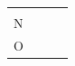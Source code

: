 \begin{enumerate}[noitemsep, label=\textbf{\arabic*}. ]
{\begin{tabular}[t]{|l|l|l|l|}
    
         &
    
    
         &
    
    
     \tabularnewline\cline{1-1}\cline{2-2}\cline{3-3}\cline{4-4}
    
    
        \begin{math}\mathrm{N}\end{math} &
    
    
         &
    
    
         &
    
    
     \tabularnewline\cline{1-1}\cline{2-2}\cline{3-3}\cline{4-4}
    
    
        \begin{math}\mathrm{O}\end{math} &
    

\end{tabular}}
\end{enumerate}
